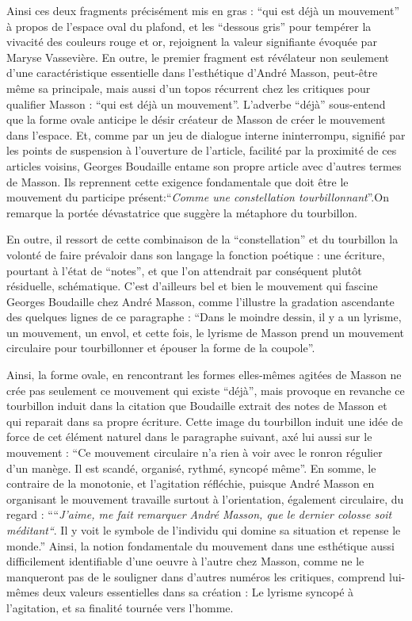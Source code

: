 Ainsi ces deux fragments précisément mis en gras : \enquote{qui est déjà un mouvement} à propos de l’espace oval du plafond, et  les \enquote{dessous gris} pour tempérer la vivacité des couleurs rouge et or, rejoignent la valeur signifiante évoquée par Maryse Vassevière. En outre, le premier fragment est révélateur non seulement d’une caractéristique essentielle dans l’esthétique d’André Masson, peut-être même sa principale, mais aussi d’un topos récurrent chez les critiques pour qualifier Masson : \enquote{qui est déjà un mouvement}. L’adverbe \enquote{déjà} sous-entend que la forme ovale anticipe le désir créateur de Masson de créer le mouvement dans l’espace. Et, comme par un jeu de dialogue interne ininterrompu, signifié par les points de suspension à l’ouverture de l’article, facilité par la proximité de ces articles voisins, Georges Boudaille entame son propre article avec d’autres termes de Masson. Ils reprennent cette exigence fondamentale que doit être le mouvement du participe présent:\enquote{\emph{Comme une constellation tourbillonnant}}.On remarque la portée dévastatrice que suggère la métaphore du tourbillon. 




	En outre, il  ressort de cette combinaison de la \enquote{constellation} et du tourbillon la volonté de faire prévaloir dans son langage la fonction poétique : une écriture, pourtant à l’état de \enquote{notes}, et que l’on attendrait par conséquent plutôt résiduelle, schématique. C’est d’ailleurs bel et bien le mouvement qui fascine Georges Boudaille chez André Masson, comme l’illustre la gradation ascendante des quelques lignes de ce paragraphe : \enquote{Dans le moindre dessin, il y a un lyrisme, un mouvement, un envol, et cette fois, le lyrisme de Masson prend un mouvement circulaire pour tourbillonner et épouser la forme de la coupole}. 

	Ainsi, la forme ovale, en rencontrant les formes elles-mêmes agitées de Masson ne crée pas seulement ce mouvement qui existe \enquote{déjà}, mais provoque en revanche ce tourbillon induit dans la citation que Boudaille extrait des notes de Masson et qui reparait dans sa propre écriture. Cette image du tourbillon induit une idée de force de cet élément naturel dans le paragraphe suivant, axé lui aussi sur le mouvement : \enquote{Ce mouvement circulaire n’a rien à voir avec le ronron régulier d’un manège. Il est scandé, organisé, rythmé, syncopé même}. En somme, le contraire de la monotonie, et l’agitation réfléchie, puisque André Masson en organisant le mouvement travaille surtout à l’orientation, également circulaire, du regard : \enquote{“\emph{J’aime, me fait remarquer André Masson, que le dernier colosse soit méditant“}. Il y voit le symbole de l’individu qui domine sa situation et repense le monde.} Ainsi, la notion fondamentale du mouvement dans une esthétique aussi difficilement identifiable d’une oeuvre à l’autre chez Masson, comme ne le manqueront pas de le souligner dans d’autres numéros les critiques, comprend lui-mêmes deux valeurs essentielles dans sa création : Le lyrisme syncopé à l’agitation, et sa finalité tournée vers l’homme. 

